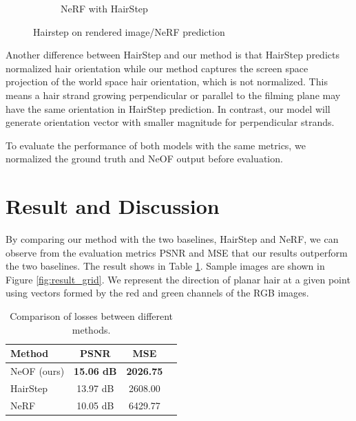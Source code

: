 \documentclass{article}
\begin{document}
\begin{figure}[h]
\begin{subfigure}{0.22\textwidth}
\begin{subfigure}{0.48\textwidth}
        \end{subfigure}
        \caption{NeRF with HairStep}
    \end{subfigure}

    \caption{Hairstep on rendered image/NeRF prediction}
    \label{fig:nerf_hairstep}
\end{figure}

Another difference between HairStep and our method is that HairStep predicts normalized hair orientation while our method captures the screen space projection of the world space hair orientation, which is not normalized. This means a hair strand growing perpendicular or parallel to the filming plane may have the same orientation in HairStep prediction. In contrast, our model will generate orientation vector with smaller magnitude for perpendicular strands.

To evaluate the performance of both models with the same metrics, we normalized the ground truth and NeOF output before evaluation.

\section{Result and Discussion}


By comparing our method with the two baselines, HairStep and NeRF, we can observe from the evaluation metrics PSNR and MSE that our results outperform the two baselines. The result shows in Table \ref{tab:loss_comparison}. Sample images are shown in Figure \ref{fig:result_grid}. We represent the direction of planar hair at a given point using vectors formed by the red and green channels of the RGB images.

\begin{table}[h]
\centering
\begin{tabular}{lccc}
\toprule
\textbf{Method} & \textbf{PSNR} & \textbf{MSE} \\ 
\midrule
NeOF (ours) & \textbf{15.06 dB} & \textbf{2026.75} \\
HairStep & 13.97 dB & 2608.00 \\
NeRF & 10.05 dB & 6429.77 \\
\bottomrule
\end{tabular}
\caption{Comparison of losses between different methods.}
\label{tab:loss_comparison}
\end{table}
\end{document}

